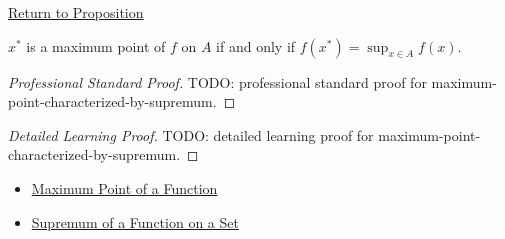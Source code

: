 \newpage
{}
\label{prf:maximum-point-characterized-by-supremum}

\begin{remark*}[Return]
\hyperref[prop:maximum-point-characterized-by-supremum]{Return to Proposition}
\end{remark*}

\begin{proposition*}
\(x^*\) is a maximum point of \(f\) on \(A\) if and only if \(f(x^*)=\sup_{x\in A}f(x)\).
\end{proposition*}

\begin{proof}[Professional Standard Proof]
\LRAProofBodyStart
TODO: professional standard proof for maximum-point-characterized-by-supremum.
\end{proof}

\begin{proof}[Detailed Learning Proof]
\LRAProofBodyStart
TODO: detailed learning proof for maximum-point-characterized-by-supremum.
\end{proof}

\begin{remark*}
\end{remark*}

\begin{dependencies}
\begin{itemize}
  \item \hyperref[def:function-maximum-point]{Maximum Point of a Function}
  \item \hyperref[def:function-supremum-on-set]{Supremum of a Function on a Set}
\end{itemize}
\end{dependencies}

\clearpage
